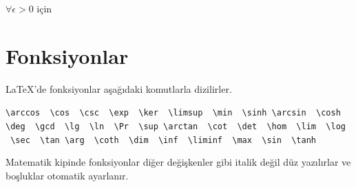 \documentclass[
  10pt,
]{scrbook}
\newenvironment{Shaded}{}{}
\newcommand{\NormalTok}[1]{#1}
\newcommand{\SpecialCharTok}[1]{\textcolor[rgb]{0.25,0.44,0.63}{#1}}
\newcommand{\SpecialStringTok}[1]{\textcolor[rgb]{0.73,0.40,0.53}{#1}}
\theoremstyle{definition}
\theoremstyle{definition}
\theoremstyle{definition}
\theoremstyle{definition}
\theoremstyle{remark}
\begin{document}
\begin{Shaded}
\end{Shaded}

\(\forall \epsilon>0\) için

\hypertarget{fonksiyonlar}{%
\section{Fonksiyonlar}\label{fonksiyonlar}}

LaTeX'de fonksiyonlar aşağıdaki komutlarla dizilirler.

\texttt{\textbackslash{}arccos\ \ \textbackslash{}cos\ \ \textbackslash{}csc\ \ \textbackslash{}exp\ \ \textbackslash{}ker\ \ \textbackslash{}limsup\ \ \textbackslash{}min\ \ \textbackslash{}sinh\ \textbackslash{}arcsin\ \ \textbackslash{}cosh\ \ \textbackslash{}deg\ \ \textbackslash{}gcd\ \ \textbackslash{}lg\ \ \textbackslash{}ln\ \ \textbackslash{}Pr\ \ \textbackslash{}sup\ \textbackslash{}arctan\ \ \textbackslash{}cot\ \ \textbackslash{}det\ \ \textbackslash{}hom\ \ \textbackslash{}lim\ \ \textbackslash{}log\ \ \textbackslash{}sec\ \ \textbackslash{}tan\ \textbackslash{}arg\ \ \textbackslash{}coth\ \ \textbackslash{}dim\ \ \textbackslash{}inf\ \ \textbackslash{}liminf\ \ \textbackslash{}max\ \ \textbackslash{}sin\ \ \textbackslash{}tanh}

Matematik kipinde fonksiyonlar diğer değişkenler gibi italik değil düz yazılırlar ve boşluklar otomatik ayarlanır.

\begin{Shaded}
\end{Shaded}
\end{document}
